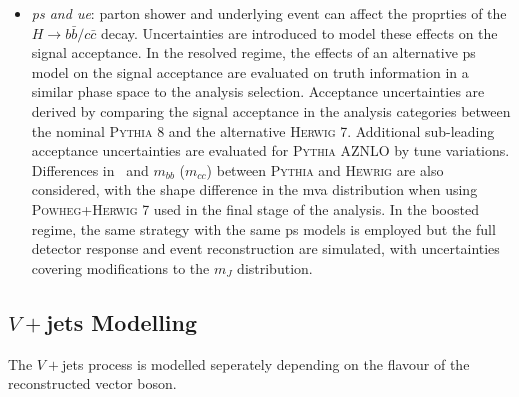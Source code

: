 \begin{itemize}
    \item \textit{\gls{ps} and \gls{ue}}: parton shower and underlying event can affect the proprties of the $H \rightarrow b\bar{b} / c\bar{c}$ decay. Uncertainties are introduced to model these effects on the signal acceptance. In the resolved regime, the effects of an alternative \gls{ps} model on the signal acceptance are evaluated on truth information in a similar phase space to the analysis selection. Acceptance uncertainties are derived by comparing the signal acceptance in the analysis categories between the nominal \textsc{Pythia} 8 and the alternative \textsc{Herwig} 7. Additional sub-leading acceptance uncertainties are evaluated for \textsc{Pythia} AZNLO by tune variations. Differences in \ptv\ and $m_{bb}$ ($m_{cc}$) between \textsc{Pythia} and \textsc{Hewrig} are also considered, with the shape difference in the \gls{mva} distribution when using \textsc{Powheg}+\textsc{Herwig} 7 used in the final stage of the analysis. In the boosted regime, the same strategy with the same \gls{ps} models is employed but the full detector response and event reconstruction are simulated, with uncertainties covering modifications to the $m_J$ distribution.
\end{itemize}

\subsection{$V+$jets Modelling}\label{sec-modVjet} %
The $V+$jets process is modelled seperately depending on the flavour of the reconstructed vector boson. 

